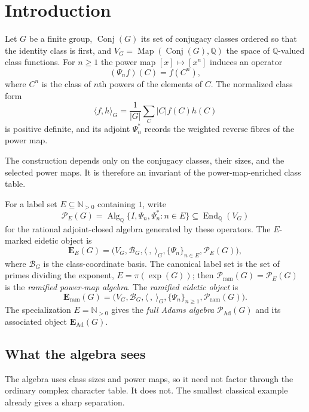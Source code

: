 \documentclass[11pt,reqno]{amsart}
\numberwithin{equation}{section}
\theoremstyle{remark}
\theoremstyle{plain}
\newcommand{\Q}{\mathbb Q}
\newcommand{\N}{\mathbb N}
\newcommand{\PE}{\mathcal P_E}
\newcommand{\Pram}{\mathcal P_{\mathrm{ram}}}
\newcommand{\PAd}{\mathcal P_{\mathrm{Ad}}}
\newcommand{\EidObj}[1]{\mathbf E_{#1}}
\newcommand{\EramObj}{\mathbf E_{\mathrm{ram}}}
\newcommand{\PAdObj}{\mathbf E_{\mathrm{Ad}}}
\newcommand{\End}{\operatorname{End}}
\newcommand{\Alg}{\operatorname{Alg}}
\newcommand{\Conj}{\operatorname{Conj}}
\newcommand{\1}{\mathbf 1}
\begin{document}
\section{Introduction}
\label{sec:introduction}

Let \(G\) be a finite group, \(\Conj(G)\) its set of conjugacy classes
ordered so that the identity class is first, and
\(V_G=\operatorname{Map}(\Conj(G),\Q)\) the space of \(\Q\)-valued class
functions.
For \(n\geq1\) the power map \([x]\mapsto[x^n]\) induces an operator
\[
 (\Psi_n f)(C)=f(C^n),
\]
where \(C^n\) is the class of \(n\)th powers of the elements of \(C\).
The normalized class form
\[
 \langle f,h\rangle_G=\frac1{|G|}\sum_C|C|f(C)h(C)
\]
is positive definite, and its adjoint
\(\Psi_n^*\) records the weighted reverse fibres of the power map.

The construction depends only on the conjugacy classes, their sizes, and
the selected power maps.  It is therefore an invariant of the
power-map-enriched class table.

For a label set \(E\subseteq\N_{>0}\) containing \(1\), write
\begin{equation}
 \PE(G)=\Alg_\Q\{I,\Psi_n,\Psi_n^*:n\in E\}\subseteq\End_\Q(V_G)
 \label{eq:pe-definition}
\end{equation}
for the rational adjoint-closed algebra generated by these operators.
The \(E\)-marked eidetic object is
\begin{equation}
 \EidObj{E}(G)=
 \bigl(V_G,\mathcal B_G,\langle\ ,\ \rangle_G,
       \{\Psi_n\}_{n\in E},\PE(G)\bigr),
 \label{eq:eidetic-object}
\end{equation}
where \(\mathcal B_G\) is the class-coordinate basis.
The canonical label set is the set of primes dividing the exponent,
\(E=\pi(\exp(G))\); then
\(\Pram(G)=\PE(G)\) is the \emph{ramified power-map algebra}.  The
\emph{ramified eidetic object} is
\begin{equation}
 \EramObj(G)=
 \bigl(V_G,\mathcal B_G,\langle\ ,\ \rangle_G,
       \{\Psi_n\}_{n\geq1},\Pram(G)\bigr).
 \label{eq:ramified-eidetic-object}
\end{equation}
The specialization \(E=\N_{>0}\) gives the \emph{full Adams algebra}
\(\PAd(G)\) and its associated object \(\PAdObj(G)\).

\subsection{What the algebra sees}

The algebra uses class sizes and power maps, so it need not factor
through the ordinary complex character table.  It does not.  The smallest
classical example already gives a sharp separation.
\end{document}
